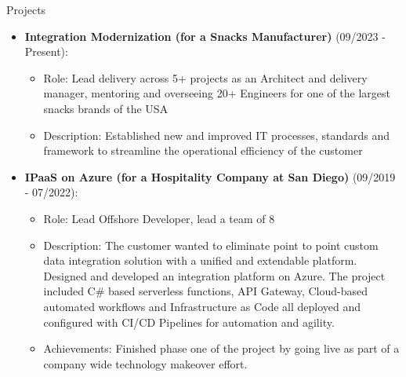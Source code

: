 \documentclass{resume} %
\begin{document}
    
    \begin{rSection}{Projects}
            \begin{itemize}
            \item \textbf{Integration Modernization (for a Snacks Manufacturer)} (09/2023 - Present):
            \begin{itemize}
                \item Role: Lead delivery across 5+ projects as an Architect and delivery manager, mentoring and overseeing 20+ Engineers for one of the largest snacks brands of the USA
                \item Description: Established new and improved IT processes, standards and framework to streamline the operational efficiency of the customer
            \end{itemize}
        \end{itemize}

        \begin{itemize}
            \item \textbf{IPaaS on Azure (for a Hospitality Company at San Diego)} (09/2019 - 07/2022):
            \begin{itemize}
                \item Role: Lead Offshore Developer, lead a team of 8
                \item Description: The customer wanted to eliminate point to point custom data integration solution with a unified and extendable platform. Designed and developed an integration platform on Azure. The project included C\# based serverless functions, API Gateway, Cloud-based automated workflows and Infrastructure as Code all deployed and configured with CI/CD Pipelines for automation and agility.
                \item Achievements: Finished phase one of the project by going live as part of a company wide technology makeover effort.
            \end{itemize}
        \end{itemize}


\end{rSection}
\end{document}
